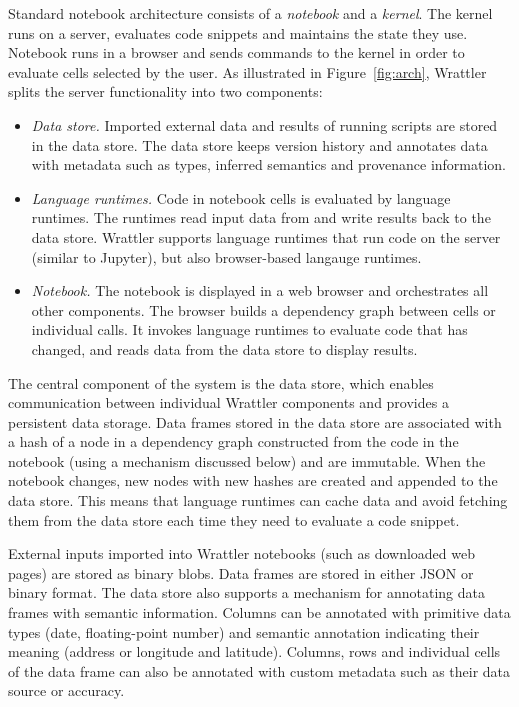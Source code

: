 \documentclass[fleqn,11pt]{report}
\theoremstyle{definition}
\newenvironment{nitemize}
{ \vspace{-0.4em}
  \begin{itemize}
    \setlength{\itemsep}{5pt}
    \setlength{\parskip}{0pt}
    \setlength{\parsep}{0pt} }
{ \end{itemize}
  \vspace{-0.4em} }
\begin{document}
Standard notebook architecture consists of a \emph{notebook} and a \emph{kernel}. The kernel
runs on a server, evaluates code snippets and maintains the state they use.
Notebook runs in a browser and sends commands to the kernel in order to evaluate
cells selected by the user. As illustrated in Figure~\ref{fig:arch}, Wrattler splits the
server functionality into two components:

\begin{nitemize}
\item \emph{Data store.} Imported external data and results of running scripts
are stored in the data store. The data store keeps version history and annotates data with
metadata such as types, inferred semantics and provenance information.

\item \emph{Language runtimes.} Code in notebook cells is evaluated by language runtimes.
The runtimes read input data from and write results back to the data store. Wrattler supports
language runtimes that run code on the server (similar to Jupyter), but also browser-based
langauge runtimes.

\item \emph{Notebook.} The notebook is displayed in a web browser and orchestrates
all other components. The browser builds a dependency graph between cells or individual
calls. It invokes language runtimes to evaluate code that has changed,
and reads data from the data store to display results.
\end{nitemize}

The central component of the system is the data store, which enables communication between
individual Wrattler components and provides a persistent data storage.
Data frames stored in the data store are associated with a hash of a node in a dependency
graph constructed from the code in the notebook (using a mechanism discussed below)
and are immutable. When the notebook changes, new nodes with new hashes are created and
appended to the data store. This means that language runtimes can cache data and avoid
fetching them from the data store each time they need to evaluate a code snippet.

External inputs imported into Wrattler notebooks (such as downloaded web pages) are stored as
binary blobs. Data frames are stored in either JSON or binary format.
The data store also supports a mechanism for annotating data frames with
semantic information. Columns can be annotated with primitive data types (date, floating-point
number) and semantic annotation indicating their meaning (address or longitude and latitude).
Columns, rows and individual cells of the data frame can also be annotated with custom metadata
such as their data source or accuracy.
\end{document}
